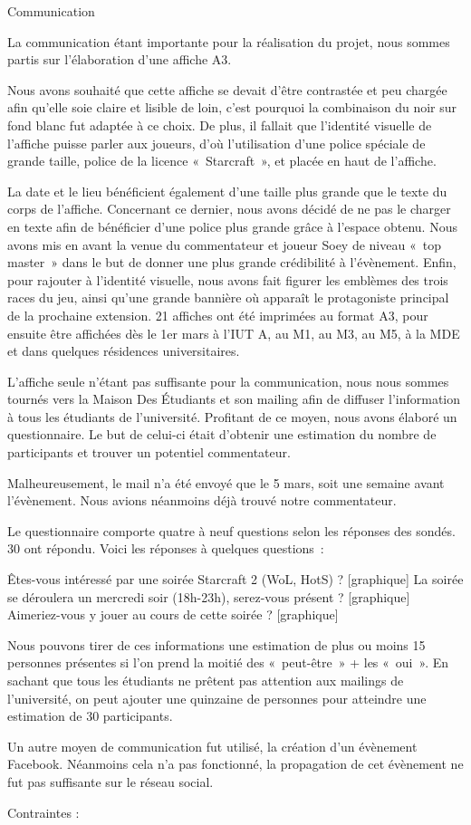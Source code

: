 Communication

	La communication étant importante pour la réalisation du projet, nous sommes partis sur l'élaboration
d'une affiche A3.

	Nous avons souhaité que cette affiche se devait d’être contrastée et peu chargée afin qu’elle soie
claire et lisible de loin, c’est pourquoi la combinaison du noir sur fond blanc fut adaptée à ce choix.
De plus, il fallait que l’identité visuelle de l’affiche puisse parler aux joueurs, d’où l’utilisation
d’une police spéciale de grande taille, police de la licence « Starcraft », et placée en haut de l’affiche.

	La date et le lieu bénéficient également d’une taille plus grande que le texte du corps de l’affiche.
Concernant ce dernier, nous avons décidé de ne pas le charger en texte afin de bénéficier d’une police
plus grande grâce à l’espace obtenu.
	Nous avons mis en avant la venue du commentateur et joueur Soey  de niveau « top master »  dans le but
de donner une plus grande crédibilité à l’évènement.
	Enfin, pour rajouter à l’identité visuelle, nous avons fait figurer  les emblèmes des trois races du jeu,
ainsi qu’une grande bannière où apparaît le protagoniste principal de la prochaine extension.
21 affiches ont été imprimées au format A3, pour ensuite être affichées dès le 1er mars à l’IUT A, au M1,
au M3, au M5, à la MDE et dans quelques résidences universitaires.

	L’affiche seule n’étant pas suffisante pour la communication, nous nous sommes tournés vers la
Maison Des Étudiants et son mailing afin de diffuser l’information à tous les étudiants de l’université.
Profitant de ce moyen, nous avons élaboré un questionnaire. Le but de celui-ci était d’obtenir une estimation
du nombre de participants et trouver un potentiel commentateur.

	Malheureusement, le mail n’a été envoyé que le 5 mars, soit une semaine avant l’évènement.
Nous avions néanmoins déjà trouvé notre commentateur.

Le questionnaire comporte quatre à neuf questions selon les réponses des sondés. 30 ont répondu.
Voici les réponses à quelques questions :


Êtes-vous intéressé par une soirée Starcraft 2 (WoL, HotS) ?
[graphique]
La soirée se déroulera un mercredi soir (18h-23h), serez-vous présent ?
[graphique]
Aimeriez-vous y jouer au cours de cette soirée ?
[graphique]

	Nous pouvons tirer de ces informations une estimation de plus ou moins 15 personnes présentes si l’on prend
la moitié des « peut-être » + les « oui ».
	En sachant que tous les étudiants ne prêtent pas attention aux mailings de l’université, on peut ajouter
une quinzaine de personnes pour atteindre une estimation de 30 participants.

	Un autre moyen de communication fut utilisé, la création d'un évènement Facebook. Néanmoins cela n'a pas fonctionné,
la propagation de cet évènement ne fut pas suffisante sur le réseau social.


Contraintes :

